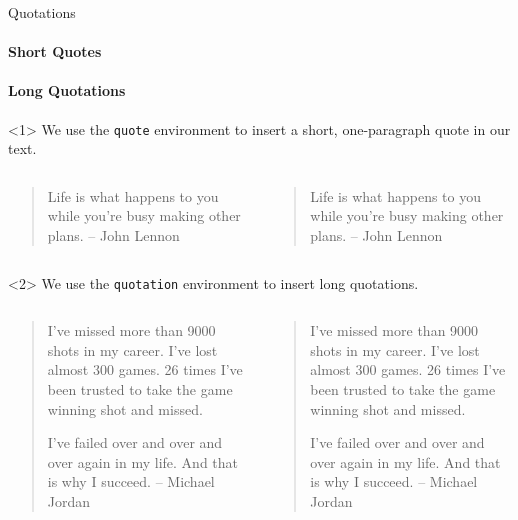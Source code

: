 \begin{frame}[fragile,c]{Quotations}
	\framesubtitle<1>{Short Quotes}
	\framesubtitle<2>{Long Quotations}
	\begin{onlyenv}
		We use the \texttt{quote} environment to insert a short, one-paragraph quote in our text.
	
		\begin{columns}
			\begin{column}{.49\textwidth}
				\vspace{-17mm}
\begin{codesource}
	\begin{quote}
		Life is what happens to you while 
		you're busy making other plans. 
		-- John Lennon
	\end{quote}
\end{codesource}
			\end{column}
		
			\begin{column}{.49\textwidth}
				\begin{quote}
					Life is what happens to you while you're busy making other plans. -- John Lennon
				\end{quote}
			\end{column}
		\end{columns}
	\end{onlyenv}

	\begin{onlyenv}
		We use the \texttt{quotation} environment to insert long quotations.
		
		\begin{columns}
			\begin{column}{.49\textwidth}
				\vspace{-38mm}
\begin{codesource}
	\begin{quotation}
		I've missed more than 9000 shots in my 
		career. I've lost almost 300 games. 26 
		times I've been trusted to take the game 
		winning shot and missed.
		
		I've failed over and over and over again 
		in my life. And that is why I succeed. 
		-- Michael Jordan
	\end{quotation}
\end{codesource}	
			\end{column}
		
			\begin{column}{.49\textwidth}
\begin{quotation}
	I've missed more than 9000 shots in my career. 
	I've lost almost 300 games. 26 times I've been 
	trusted to take the game winning shot and missed.
	
	I've failed over and over and over again in my life. 
	And that is why I succeed. -- Michael Jordan
\end{quotation}
			\end{column}
		\end{columns}
	\end{onlyenv}
\end{frame}

